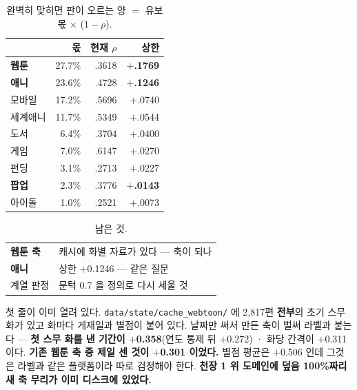 \documentclass[10pt]{article}
\begin{document}
\begin{table}[t]
\centering\tsize
\caption{완벽히 맞히면 판이 오르는 양 $=$ 유보 몫 $\times$ ($1-\rho$).}
\begin{tabular}{lrrr}
\toprule
& 몫 & 현재 $\rho$ & 상한 \\
\midrule
\textbf{웹툰} & 27.7\% & .3618 & \textbf{$+$.1769} \\
\textbf{애니} & 23.6\% & .4728 & \textbf{$+$.1246} \\
모바일 & 17.2\% & .5696 & $+$.0740 \\
세계애니 & 11.7\% & .5349 & $+$.0544 \\
도서 & 6.4\% & .3704 & $+$.0400 \\
게임 & 7.0\% & .6147 & $+$.0270 \\
펀딩 & 3.1\% & .2713 & $+$.0227 \\
\textbf{팝업} & 2.3\% & .3776 & \textbf{$+$.0143} \\
아이돌 & 1.0\% & .2521 & $+$.0073 \\
\bottomrule
\end{tabular}
\end{table}



\begin{table}[t]
\centering\tsize
\caption{남은 것.}
\begin{tabular}{ll}
\toprule
\textbf{웹툰 축} & 캐시에 화별 자료가 있다 --- 축이 되나 \\
\textbf{애니} & 상한 $+$0.1246 --- 같은 질문 \\
계열 판정 & 문턱 0.7 을 정의로 다시 세울 것 \\
\bottomrule
\end{tabular}
\end{table}

첫 줄이 이미 열려 있다. \texttt{data/state/cache\_webtoon/} 에 2,817편
\textbf{전부}의 초기 스무 화가 있고 화마다 게재일과 별점이 붙어 있다.
날짜만 써서 만든 축이 벌써 라벨과 붙는다 --- \textbf{첫 스무 화를 낸
기간이 $+$0.358}(연도 통제 뒤 $+$0.272) · 화당 간격이 $+$0.311 이다.
\textbf{기존 웹툰 축 중 제일 센 것이 $+$0.301 이었다.} 별점 평균은
$+$0.506 인데 그것은 라벨과 같은 플랫폼이라 따로 검정해야 한다.
\textbf{천장 1 위 도메인에 덮음 100\%짜리 새 축 무리가 이미 디스크에
있었다.}
\end{document}

